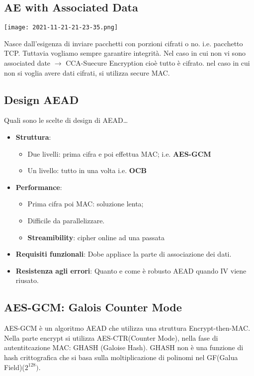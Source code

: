 \documentclass{article}
\theoremstyle{remark}
\begin{document}
\subsection{AE with Associated Data}
\begin{center}
    \texttt{[image: 2021-11-21-21-23-35.png]}
\end{center}
Nasce dall'esigenza di inviare pacchetti con porzioni cifrati o no. i.e. pacchetto TCP. Tuttavia vogliamo sempre garantire
integrità.\newline
Nel caso in cui non vi sono associated date $\rightarrow$ CCA-Suecure Encryption cioè tutto è cifrato. nel caso in cui non si
voglia avere dati cifrati, si utilizza secure MAC.
\subsection{Design AEAD}
Quali sono le scelte di design di AEAD\dots
\begin{itemize}
        \item \textbf{Struttura}: \begin{itemize}
        \item Due livelli: prima cifra e poi effettua MAC; i.e. \textbf{AES-GCM}
        \item Un livello: tutto in una volta i.e. \textbf{OCB}
         \end{itemize}
        \item \textbf{Performance}: \begin{itemize}
        \item Prima cifra poi MAC: soluzione lenta;
        \item Difficile da parallelizzare.
        \item \textbf{Streamibility}: cipher online ad una passata
    \end{itemize}
    \item \textbf{Requisiti funzionali}: Dobe appliace la parte di associazione dei dati.
    \item \textbf{Resistenza agli errori}: Quanto e come è robusto AEAD quando IV viene riusato.
\end{itemize}
\subsection{AES-GCM: Galois Counter Mode}
AES-GCM è un algoritmo AEAD che utilizza una struttura Encrypt-then-MAC. Nella parte encrypt si utilizza AES-CTR(Counter Mode),
nella fase di autentitcazione MAC: GHASH (Galoise Hash). GHASH non è una funzione di hash crittografica che si basa sulla moltiplicazione
di polinomi nel GF(Galua Field)($2^{128})$.\newline
\end{document}
